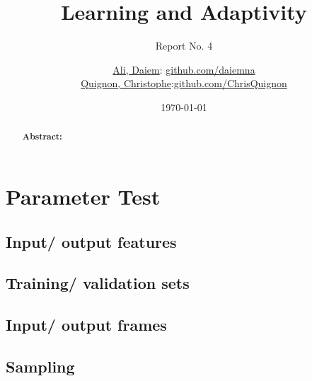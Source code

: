 \documentclass{scrartcl}
\begin{document}
\title{Learning and Adaptivity}
\subtitle{Report No. 4}
\author{
  \href{daiem.ali@smail.inf.h-brs.de}{Ali, Daiem}: \href{https://github.com/daiemna}{github.com/daiemna}\\
  \href{christophe.quignon@smail.inf.h-brs.de}{Quignon, Christophe}:\href{https://github.com/ChrisQuignon}{github.com/ChrisQuignon}
}
\date{\today}


\maketitle



\begin{abstract}
\textbf{Abstract:}
\end{abstract}

\section{Parameter Test}
\label{sec:parameter}


\subsection{Input/ output features}
\label{sec:}


\subsection{Training/ validation sets}
\label{sec:}

\subsection{Input/ output frames}
\label{sec:}

\subsection{Sampling}
\label{sec:}
\end{document}
